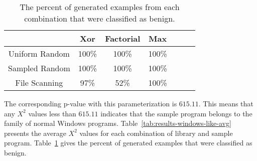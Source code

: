 \documentclass[finalcopy,short]{srpaper}
\begin{document}
        \begin{table}
            \centering
            \begin{tabular}{|c||c|c|c|c|c|c|}
                \hline
                                & Xor & Factorial & Max \\
                \hline
                Uniform Random  & 100\% & 100\% & 100\%\\
                \hline
                Sampled Random  & 100\% & 100\% & 100\%\\
                \hline
                File Scanning   & 97\% & 52\% & 100\% \\
                \hline
            \end{tabular}
            \caption{The percent of generated examples from each combination
                that were classified as benign.}
            \label{tab:results-windows-like-passed}
        \end{table}

        The corresponding p-value with this parameterization is $615.11$. This
        means that any $X^2$ values less than $615.11$ indicates that the sample
        program belongs to the family of normal Windows programs.
        Table~\ref{tab:results-windows-like-avg} presents the average $X^2$
        values for each combination of library and sample program.
        Table~\ref{tab:results-windows-like-passed} gives the percent of
        generated examples that were classified as benign.




     
\end{document}
